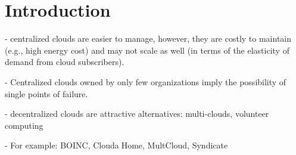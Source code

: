 \section{Introduction} \label{sect:intro}

- centralized clouds are easier to manage, however, they are costly to maintain (e.g., high energy cost) and may not scale as well (in terms of the elasticity of demand from cloud subscribers).

- Centralized clouds owned by only few organizations imply the possibility of single points of failure.

- decentralized clouds are attractive alternatives: multi-clouds, volunteer computing

- For example: BOINC, Cloud\textcircled{a}Home, MultCloud, Syndicate
